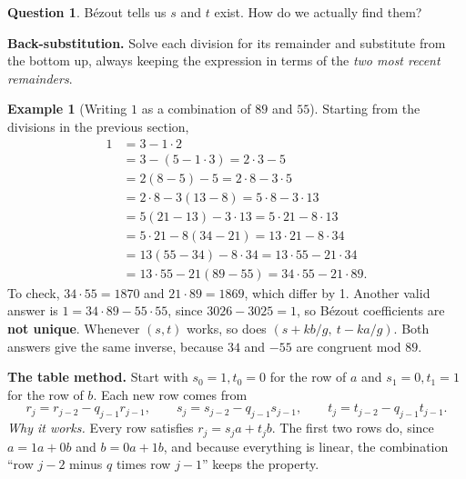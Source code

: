 \documentclass[11pt,a4paper]{article}
\theoremstyle{definition}
\newtheorem{example}[theorem]{Example}
\theoremstyle{noteit}
\newtheorem*{question}{Question}
\theoremstyle{note}
\begin{document}
\begin{question}
Bézout tells us $s$ and $t$ exist. How do we actually find them?
\end{question}

\textbf{Back-substitution.} Solve each division for its remainder and substitute from the bottom up, always keeping the expression in terms of the \emph{two most recent remainders}.

\begin{example}[Writing $1$ as a combination of $89$ and $55$]
Starting from the divisions in the previous section,
\[
\begin{aligned}
1 &= 3-1\cdot 2\\
  &= 3-(5-1\cdot 3)= 2\cdot 3-5\\
  &= 2(8-5)-5 = 2\cdot 8-3\cdot 5\\
  &= 2\cdot 8-3(13-8) = 5\cdot 8-3\cdot 13\\
  &= 5(21-13)-3\cdot13 = 5\cdot 21-8\cdot 13\\
  &= 5\cdot21-8(34-21) = 13\cdot 21-8\cdot 34\\
  &= 13(55-34)-8\cdot34 = 13\cdot 55-21\cdot 34\\
  &= 13\cdot55-21(89-55) = 34\cdot 55-21\cdot 89.
\end{aligned}
\]
To check, $34\cdot55=1870$ and $21\cdot 89=1869$, which differ by 1. Another valid answer is $1=34\cdot89-55\cdot55$, since $3026-3025=1$, so Bézout coefficients are \textbf{not unique}. Whenever $(s,t)$ works, so does $(s+kb/g,\ t-ka/g)$. Both answers give the same inverse, because $34$ and $-55$ are congruent mod $89$.
\end{example}

\textbf{The table method.} Start with $s_0=1,t_0=0$ for the row of $a$ and $s_1=0,t_1=1$ for the row of $b$. Each new row comes from
\[
r_j=r_{j-2}-q_{j-1}r_{j-1},\qquad s_j=s_{j-2}-q_{j-1}s_{j-1},\qquad t_j=t_{j-2}-q_{j-1}t_{j-1}.
\]
\emph{Why it works.} Every row satisfies $r_j=s_ja+t_jb$. The first two rows do, since $a=1a+0b$ and $b=0a+1b$, and because everything is linear, the combination ``row $j-2$ minus $q$ times row $j-1$'' keeps the property.
\end{document}
